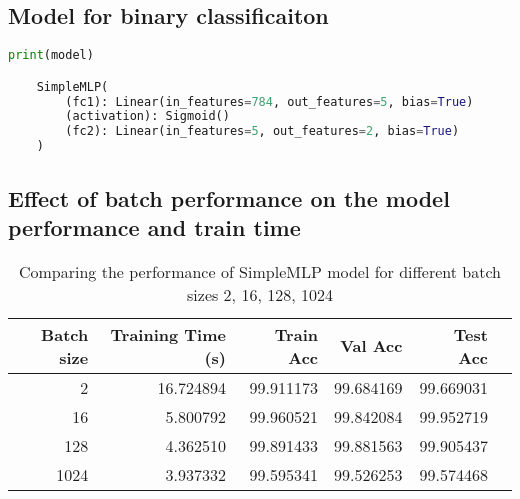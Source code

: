 \begin{solve}

    \subsection{Model for binary classificaiton}

    \begin{lstlisting}[language=python]
    print(model)

    SimpleMLP(
        (fc1): Linear(in_features=784, out_features=5, bias=True)
        (activation): Sigmoid()
        (fc2): Linear(in_features=5, out_features=2, bias=True)
    )
    \end{lstlisting}


    \subsection*{Effect of batch performance on the model performance and train time}

    \begin{table}[H]
        \centering
        \begin{tabular}{rrrrrr}
            \toprule
            Batch size & Training Time (s) & Train Acc &  Val Acc & Test Acc \\
            \midrule
            2 & 16.724894 & 99.911173 & 99.684169 & 99.669031 \\
            16 & 5.800792 & 99.960521 & 99.842084 & 99.952719 \\
            128 & 4.362510 & 99.891433 & 99.881563 & 99.905437 \\
            1024 & 3.937332 & 99.595341 & 99.526253 & 99.574468 \\
            \bottomrule
        \end{tabular}
        \caption{Comparing the performance of SimpleMLP model for different batch sizes 2, 16, 128, 1024}
    \end{table}
    
\end{solve}